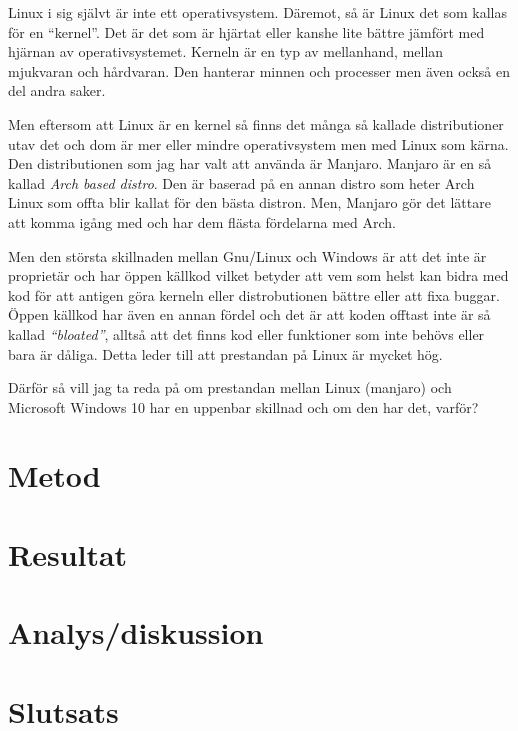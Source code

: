 \documentclass[a4paper, 12pt]{report}
\begin{document}
    Linux i sig självt är inte ett operativsystem. Däremot, så är Linux det som kallas för en ``kernel''\cite{redhat}. Det är det som är hjärtat eller kanshe lite bättre jämfört med hjärnan av operativsystemet. Kerneln är en typ av mellanhand, mellan mjukvaran och hårdvaran. Den hanterar minnen och processer men även också en del andra saker.

    Men eftersom att Linux är en kernel så finns det många så kallade distributioner utav det och dom är mer eller mindre operativsystem men med Linux som kärna. Den distributionen som jag har valt att använda är Manjaro\cite{manjaro}. Manjaro är en så kallad \textit{Arch based distro}. Den är baserad på en annan distro som heter Arch Linux som offta blir kallat för den bästa distron. Men, Manjaro gör det lättare att komma igång med och har dem flästa fördelarna med Arch.

    Men den största skillnaden mellan Gnu/Linux och Windows är att det inte är proprietär och har öppen källkod vilket betyder att vem som helst kan bidra med kod för att antigen göra kerneln eller distrobutionen bättre eller att fixa buggar. Öppen källkod har även en annan fördel och det är att koden offtast inte är så kallad \textit{``bloated''}, alltså att det finns kod eller funktioner som inte behövs eller bara är dåliga. Detta leder till att prestandan på Linux är mycket hög. 
    
    Därför så vill jag ta reda på om prestandan mellan Linux (manjaro) och Microsoft Windows 10 har en uppenbar skillnad och om den har det, varför?

\section{Metod}



\section{Resultat}

\section{Analys/diskussion}



\section{Slutsats}


\printbibliography
\end{document}
